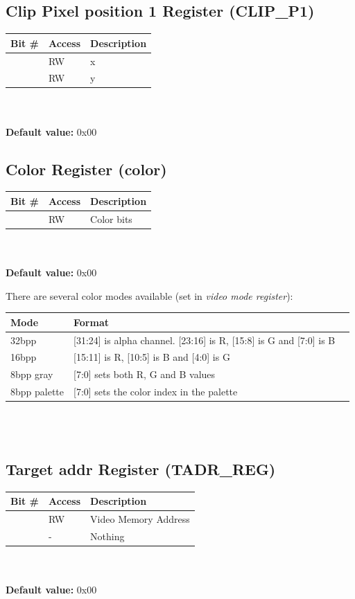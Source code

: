 \documentclass[10pt,a4paper]{article}
\begin{document}
\subsection{Clip Pixel position 1 Register (CLIP\_P1)}
\begin{tabular}{|l|l|l|}
\hline \textbf{Bit \#} & \textbf{Access} & \textbf{Description} \\ 
\hline
\hline [31:16] & RW & x \\
\hline [15:0] & RW & y \\
\hline 
\end{tabular}
\\\\
\textbf{Default value:} 0x00

\subsection{Color Register (color)}
\begin{tabular}{|l|l|l|}
\hline \textbf{Bit \#} & \textbf{Access} & \textbf{Description} \\ 
\hline
\hline [31:0] & RW & Color bits \\
\hline 
\end{tabular}
\\\\
\textbf{Default value:} 0x00

There are several color modes available (set in \textit{video mode register}):

\begin{tabular}{|l|l|l|}
\hline \textbf{Mode} & \textbf{Format} \\ 
\hline
\hline 32bpp & [31:24] is alpha channel. [23:16] is R, [15:8] is G and [7:0] is B \\
\hline 16bpp & [15:11] is R, [10:5] is B and [4:0] is G\\
\hline 8bpp gray & [7:0] sets both R, G and B values \\
\hline 8bpp palette & [7:0] sets the color index in the palette \\
\hline 
\end{tabular}
\\\\

\subsection{Target addr Register (TADR\_REG)}
\begin{tabular}{|l|l|l|}
\hline \textbf{Bit \#} & \textbf{Access} & \textbf{Description} \\ 
\hline
\hline [31:2] & RW & Video Memory Address \\
\hline [1:0] & - & Nothing \\
\hline 
\end{tabular}
\\\\
\textbf{Default value:} 0x00
\end{document}
